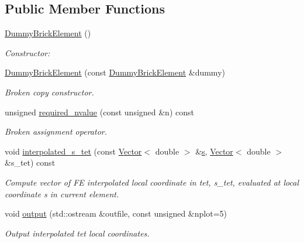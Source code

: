 \subsection*{Public Member Functions}
\begin{DoxyCompactItemize}
\item 
\hyperlink{classoomph_1_1DummyBrickElement_ae95606b8512a61a7288505021f9e5ad9}{Dummy\+Brick\+Element} ()
\begin{DoxyCompactList}\small\item\em Constructor\+: \end{DoxyCompactList}\item 
\hyperlink{classoomph_1_1DummyBrickElement_a444eeafc5ef040e21f20a73366da567c}{Dummy\+Brick\+Element} (const \hyperlink{classoomph_1_1DummyBrickElement}{Dummy\+Brick\+Element} \&dummy)
\begin{DoxyCompactList}\small\item\em Broken copy constructor. \end{DoxyCompactList}\item 
unsigned \hyperlink{classoomph_1_1DummyBrickElement_ab3d0bc190651749c1f1320c64a5375e0}{required\+\_\+nvalue} (const unsigned \&n) const
\begin{DoxyCompactList}\small\item\em Broken assignment operator. \end{DoxyCompactList}\item 
void \hyperlink{classoomph_1_1DummyBrickElement_ae0b87160f90b9c04ccb12e93bd266cff}{interpolated\+\_\+s\+\_\+tet} (const \hyperlink{classoomph_1_1Vector}{Vector}$<$ double $>$ \&\hyperlink{cfortran_8h_ab7123126e4885ef647dd9c6e3807a21c}{s}, \hyperlink{classoomph_1_1Vector}{Vector}$<$ double $>$ \&s\+\_\+tet) const
\begin{DoxyCompactList}\small\item\em Compute vector of FE interpolated local coordinate in tet, s\+\_\+tet, evaluated at local coordinate s in current element. \end{DoxyCompactList}\item 
void \hyperlink{classoomph_1_1DummyBrickElement_aed7e6c49983412089fd46628bc07279a}{output} (std\+::ostream \&outfile, const unsigned \&nplot=5)
\begin{DoxyCompactList}\small\item\em Output interpolated tet local coordinates. \end{DoxyCompactList}\end{DoxyCompactItemize}


